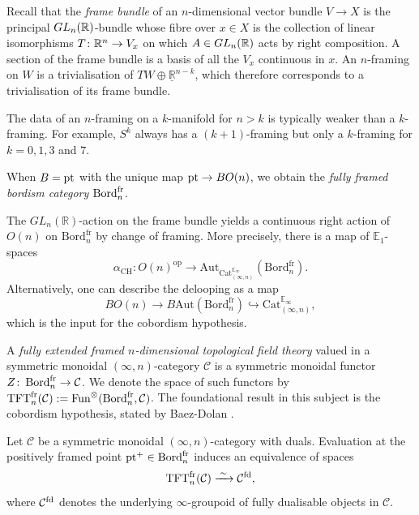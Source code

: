 \documentclass{amsart}
\begin{document}
Recall that the \emph{frame bundle} of an $n$-dimensional vector bundle $V \to X$ is the principal $GL_n(\mathbb{R})$-bundle whose fibre over $x \in X$ is the collection of linear isomorphisms $T \colon \mathbb{R}^n \to V_x$ on which $A \in GL_n(\mathbb{R})$ acts by right composition. 
A section of the frame bundle is a basis of all the $V_x$ continuous in $x$.
An $n$-framing on $W$ is a trivialisation of $TW \oplus \underline{\mathbb{R}}^{n-k}$, which therefore corresponds to a trivialisation of its frame bundle.


\begin{remark}
    The data of an $n$-framing on a $k$-manifold for $n>k$ is typically weaker than a $k$-framing.
    For example, $S^k$ always has a $(k+1)$-framing but only a $k$-framing for $k = 0,1,3$ and $7$.
\end{remark}

\begin{definition}
When $B = \operatorname{pt}$ with the unique map $\operatorname{pt} \to BO(n)$, we obtain the \emph{fully framed bordism category} $\operatorname{Bord}_n^{\mathrm{fr}}$. 
\end{definition}


\begin{remark}
\label{rmk:O(n)-action}
The $GL_n(\mathbb{R})$-action on the frame bundle yields a continuous right action of $O(n)$ on $\mathrm{Bord}_n^{\mathrm{fr}}$ by change of framing. More precisely, there is a map of $\mathbb{E}_1$-spaces
\[
\alpha_{\mathrm{CH}} \colon O(n)^{\mathrm{op}} \to \mathrm{Aut}_{\mathrm{Cat}_{(\infty,n)}^{\mathbb{E}_\infty}}(\mathrm{Bord}_n^{\mathrm{fr}}).
\]
Alternatively, one can describe the delooping as a map
\[
BO(n) \to B\mathrm{Aut}(\mathrm{Bord}_n^{\mathrm{fr}}) \hookrightarrow \mathrm{Cat}_{(\infty,n)}^{\mathbb{E}_\infty},
\]
which is the input for the cobordism hypothesis.
\end{remark}

\noindent
A \emph{fully extended framed $n$-dimensional topological field theory} valued in a symmetric monoidal $(\infty,n)$-category $\mathcal{C}$ is a symmetric monoidal functor $Z\colon\operatorname{Bord}_n^{\mathrm{fr}}\to \mathcal{C}$. We denote the space of such functors by $\mathrm{TFT}^{\mathrm{fr}}_n(\mathcal{C}) := \operatorname{Fun}^{\otimes}(\operatorname{Bord}_n^{\mathrm{fr}}, \mathcal{C})$. The foundational result in this subject is the cobordism hypothesis, stated by Baez-Dolan \cite{baez1995higher}.


\begin{theorem}\label{thm:cobordism-hypothesis}
Let $\mathcal{C}$ be a symmetric monoidal $(\infty, n)$-category with duals. Evaluation at the positively framed point $\operatorname{pt}^+ \in \operatorname{Bord}_n^{\mathrm{fr}}$ induces an equivalence of spaces
\[
\mathrm{TFT}_n^{\mathrm{fr}}(\mathcal{C}) \xrightarrow{\;\sim\;} \mathcal{C}^{\mathrm{fd}},
\]
where $\mathcal{C}^{\mathrm{fd}}$ denotes the underlying $\infty$-groupoid of fully dualisable objects in $\mathcal{C}$. 
\end{theorem}
\end{document}
